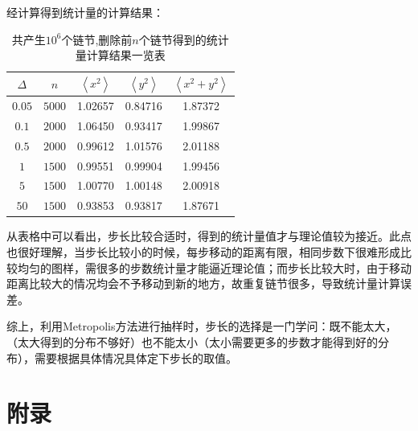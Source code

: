 \documentclass[a4paper,11pt]{article}
\begin{document}
经计算得到统计量的计算结果：

\begin{table}[!htbp]
\centering
\begin{tabular}{|c|c|c|c|c|}
\hline
$\Delta$  &$n$          &$\left < x^{2}  \right >$   &$\left < y^{2}  \right >$     &$\left < x^{2} + y^{2} \right >$     \\ \hline
$0.05$ & $5000$   &1.02657   &0.84716   &1.87372  \\ \hline
$0.1$  & $2000$   &1.06450   &0.93417   &1.99867  \\ \hline
$0.5$  & $2000$   &0.99612   &1.01576   &2.01188  \\ \hline
$1$    & $1500$   &0.99551   &0.99904   &1.99456  \\ \hline
$5$    & $1500$   &1.00770   &1.00148   &2.00918  \\ \hline
$50$   & $1500$   &0.93853   &0.93817   &1.87671  \\ \hline


\end{tabular}
\caption{共产生$10^{6}$个链节,删除前$n$个链节得到的统计量计算结果一览表}
\end{table}

从表格中可以看出，步长比较合适时，得到的统计量值才与理论值较为接近。此点也很好理解，当步长比较小的时候，每步移动的距离有限，相同步数下很难形成比较均匀的图样，需很多的步数统计量才能逼近理论值；而步长比较大时，由于移动距离比较大的情况均会不予移动到新的地方，故重复链节很多，导致统计量计算误差。

综上，利用Metropolis方法进行抽样时，步长的选择是一门学问：既不能太大，（太大得到的分布不够好）也不能太小（太小需要更多的步数才能得到好的分布），需要根据具体情况具体定下步长的取值。





\newpage
\section{附录}
\end{document}
